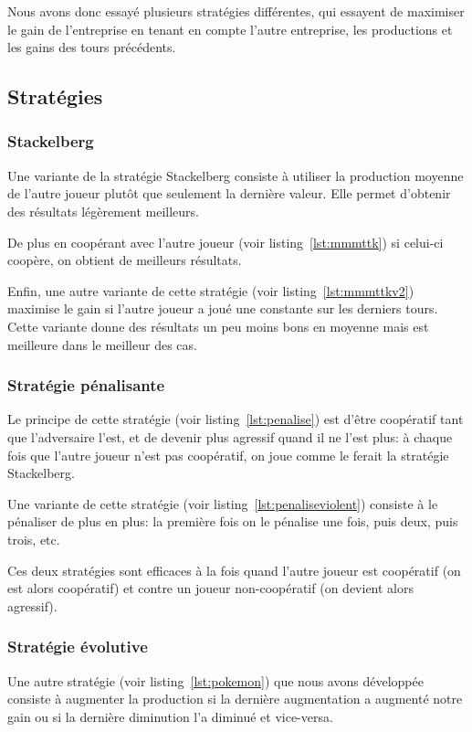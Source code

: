 \documentclass{scrartcl}
\begin{document}
    Nous avons donc essayé plusieurs stratégies différentes, qui essayent de
    maximiser le gain de l'entreprise en tenant en compte l'autre entreprise,
    les productions et les gains des tours précédents.

  \subsection{Stratégies}
    \subsubsection{Stackelberg}
      Une variante de la stratégie Stackelberg consiste à utiliser la
      production moyenne de l'autre joueur plutôt que seulement la dernière
      valeur. Elle permet d'obtenir des résultats légèrement meilleurs.

      De plus en coopérant avec l'autre joueur (voir listing~\ref{lst:mmmttk})
      si celui-ci coopère, on obtient de meilleurs résultats.

      Enfin, une autre variante de cette stratégie (voir
      listing~\ref{lst:mmmttkv2}) maximise le gain si l'autre joueur a joué une
      constante sur les derniers tours. Cette variante donne des résultats
      un peu moins bons en moyenne mais est meilleure dans le meilleur des cas.

    \subsubsection{Stratégie pénalisante}
      Le principe de cette stratégie (voir listing~\ref{lst:penalise}) est
      d'être coopératif tant que l'adversaire l'est, et de devenir plus
      agressif quand il ne l'est plus: à chaque fois que l'autre joueur n'est
      pas coopératif, on joue comme le ferait la stratégie Stackelberg.

      Une variante de cette stratégie (voir listing~\ref{lst:penaliseviolent})
      consiste à le pénaliser de plus en plus: la première fois on le pénalise
      une fois, puis deux, puis trois, etc.

      Ces deux stratégies sont efficaces à la fois quand l'autre joueur est
      coopératif (on est alors coopératif) et contre un joueur non-coopératif
      (on devient alors agressif).

    \subsubsection{Stratégie évolutive}
      Une autre stratégie (voir listing~\ref{lst:pokemon}) que nous avons
      développée consiste à augmenter la production si la dernière augmentation
      a augmenté notre gain ou si la dernière diminution l'a diminué et
      vice-versa.
\end{document}
